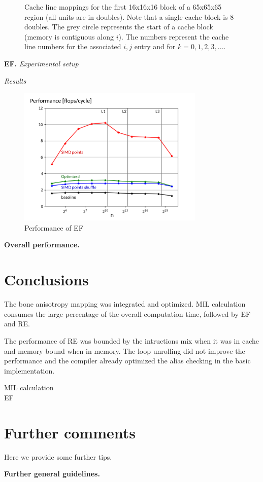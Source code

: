 \documentclass[letterpaper]{article}
\newcommand{\mypar}[1]{{\bf #1.}}
\newcommand\inputpgf[2]{{
\let\pgfimageWithoutPath\pgfimage
\renewcommand{\pgfimage}[2][]{\pgfimageWithoutPath[##1]{#1/##2}}

}}
\begin{document}
\begin{figure}[H]
  \inputpgf{figs/conflict_miss}{mil_blocking_conflicts_65.pgf}\vspace{-1cm}
  \caption{Cache line mappings for the first 16x16x16 block of a 65x65x65 region (all units are in doubles). Note that a single cache block is 8 doubles. The grey circle represents the start of a cache block (memory is contiguous along $i$). The numbers represent the cache line numbers for the associated $i,j$ entry and for $k=0,1,2,3,...$. }
  \label{res:conflict_miss_65}
\end{figure}

\mypar{EF} \textit{Experimental setup}

\textit{Results}
 
\begin{figure}[H]
  \centering \includegraphics[width=3.5in]{figs/plots/ellipsoid/ellipsoid_performance.pdf}
  \caption{Performance of EF}
  \label{res:ellipsoid}
\end{figure}


\mypar{Overall performance}

\section{Conclusions}

The bone anisotropy mapping was integrated and optimized. MIL calculation consumes the large percentage of the overall computation time, followed by EF and RE. 

The performance of RE was bounded by the intructions mix when it was in cache and memory bound when in memory. The loop unrolling did not improve the performance and the compiler already optimized the alias checking in the basic implementation.

MIL calculation\\

EF\\


\section{Further comments}

Here we provide some further tips. 

\mypar{Further general guidelines}



\end{document}
